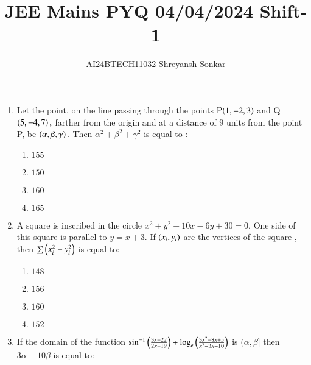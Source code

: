\documentclass[journal]{IEEEtran}
\begin{document}

\vspace{3cm}


\renewcommand{\thefigure}{\theenumi}
\renewcommand{\thetable}{\theenumi}
\setlength{\intextsep}{10pt} %


\renewcommand{\thetable}{\theenumi}

\title{JEE Mains PYQ 04/04/2024 Shift-1}
\author{AI24BTECH11032 Shreyansh Sonkar
}
\maketitle
\renewcommand{\thefigure}{\theenumi}
\renewcommand{\thetable}{\theenumi}
\begin{enumerate}[start=16] %
\item Let the point, on the line passing through the points P$\left(1,-2,3\right)$ and Q$\left(5,-4,7\right),$ farther from the origin and at a distance of $9$ units from the point P, be $\left(\alpha,\beta,\gamma\right).$ Then $\alpha^{2}+\beta^{2}+\gamma^{2}$ is equal to :
\begin{multicols}{2}
    \begin{enumerate}
        \item $155$
        \item $150$
        \item $160$
        \item $165$
    \end{enumerate}
\end{multicols}
\bigskip
\item A square is inscribed in the circle $x^{2}+y^{2}-10x-6y+30=0.$ One side of this square is parallel to $y = x + 3. $
If $\left(x_i,y_i\right)$ are the vertices of the square , then $\sum \left(x_i^{2}+y_i^{2}\right)$ is equal to:
\begin{multicols}{2}
    \begin{enumerate}
        \item $148$
        \item $156$
        \item $160$
        \item $152$
    \end{enumerate}
\end{multicols}
\bigskip
\item If the domain of the function $\sin^{-1}\left(\frac{3x - 22}{2x - 19}\right) + \log_e\left(\frac{3x^2 - 8x + 5}{x^2 - 3x - 10}\right)$ is $(\alpha,\beta]$ then $3\alpha+10\beta$ is equal to:

\end{enumerate}
\end{document}
